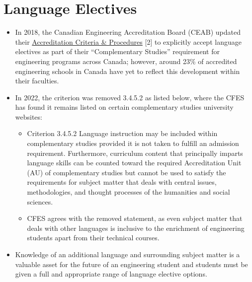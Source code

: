 \section{Language Electives}\label{language-electives}



\begin{itemize}
 \item In 2018, the Canadian Engineering Accreditation Board (CEAB) updated their \href{https://engineerscanada.ca/sites/default/files/accreditation/2021-2022-cycle/accreditation-criteria-procedures-2020.pdf}{Accreditation Criteria \& Procedures} [2] to explicitly accept language electives as part of their ``Complementary Studies'' requirement for engineering programs across Canada; however, around 23\% of accredited engineering schools in Canada have yet to reflect this development within their faculties.
 \item In 2022, the criterion was removed 3.4.5.2 as listed below, where the CFES has found it remains listed on certain complementary studies university websites:
 \begin{itemize}
  \item [REMOVED] Criterion 3.4.5.2 Language instruction may be included within complementary studies provided it is not taken to fulfill an admission requirement. Furthermore, curriculum content that principally imparts language skills can be counted toward the required Accreditation Unit (AU) of complementary studies but cannot be used to satisfy the requirements for subject matter that deals with central issues, methodologies, and thought processes of the humanities and social sciences.
  \item CFES agrees with the removed statement, as even subject matter that deals with other languages is inclusive to the enrichment of engineering students apart from their technical courses.
 \end{itemize}
 \item Knowledge of an additional language and surrounding subject matter is a valuable asset for the future of an engineering student and students must be given a full and appropriate range of language elective options.
\end{itemize}

